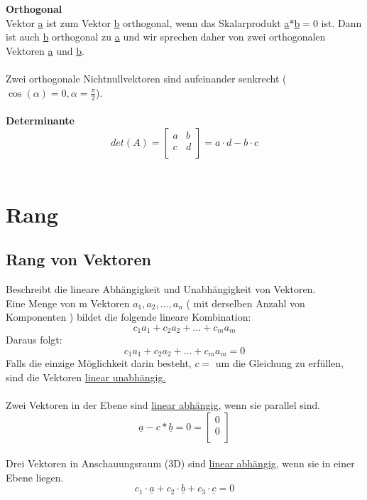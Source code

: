 \\
\\
\textbf{Orthogonal} \\
Vektor \underline{a} ist zum Vektor \underline{b} orthogonal, wenn das Skalarprodukt \underline{a}$*$\underline{b}$=0$ ist. Dann ist auch \underline{b} orthogonal zu \underline{a} und wir sprechen daher von zwei orthogonalen Vektoren \underline{a} und \underline{b}.\\
\\
Zwei orthogonale Nichtnullvektoren sind aufeinander senkrecht ($\cos(\alpha)=0,\alpha=\frac{\pi}{2}$).
\\
\\
\textbf{Determinante}
\[
	det(A)=
	\begin{bmatrix}
	a & b  \\
	c & d  \\
	\end{bmatrix}
	=a \cdot d - b \cdot c
\]
\\
\section{Rang}
\subsection{Rang von Vektoren}
Beschreibt die lineare Abhängigkeit und Unabhängigkeit von Vektoren.
\\
Eine Menge von m Vektoren $a_1,a_2,...,a_n$ ( mit derselben Anzahl von Komponenten ) bildet die folgende lineare Kombination:
\[
	c_1a_1+c_2a_2+...+c_ma_m
\]
Daraus folgt:
\[
	c_1a_1+c_2a_2+...+c_ma_m=0
\]
Falls die einzige Möglichkeit darin besteht, $c=$ um die Gleichung zu erfüllen, sind die Vektoren \underline{linear unabhängig.}
\\
\\
Zwei Vektoren in der Ebene sind \underline{linear abhängig}, wenn sie parallel sind.
\[
	\underline{a}-c*\underline{b}=0=\begin{bmatrix}
	0  \\
	0  \\
	\end{bmatrix}
\]
\\
Drei Vektoren in Anschauungsraum (3D) sind \underline{linear abhängig}, wenn sie in einer Ebene liegen.
\[
	c_1\cdot\underline{a}+c_2\cdot\underline{b}+c_3\cdot\underline{c}=0
\]

